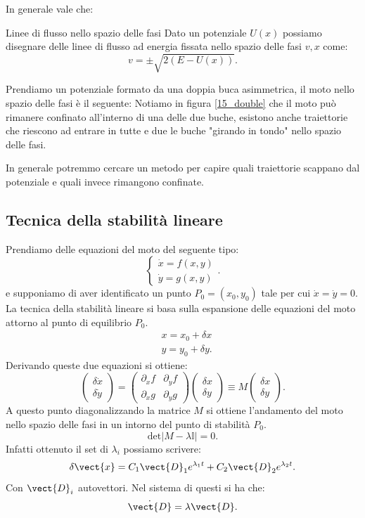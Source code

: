 \noindent
In generale vale che:
\begin{redbox}{Linee di flusso nello spazio delle fasi}
    Dato un potenziale $U(x)$ possiamo disegnare delle linee di flusso ad energia fissata nello spazio delle fasi $v,x$ come:
    \[
	v = \pm \sqrt{2(E-U(x))} 
    .\] 
\end{redbox}
\noindent
\begin{exmp}
Prendiamo un potenziale formato da una doppia buca asimmetrica, il moto nello spazio delle fasi è il seguente:    
%
Notiamo in figura \ref{15_double} che il moto può rimanere confinato all'interno di una delle due buche, esistono anche traiettorie che riescono ad entrare in tutte e due le buche "girando in tondo" nello spazio delle fasi. 
\end{exmp}
\noindent
In generale potremmo cercare un metodo per capire quali traiettorie scappano dal potenziale e quali invece rimangono confinate.
\subsection{Tecnica della stabilità lineare}%
\label{sub:Tecnica della stabilità lineare}
Prendiamo delle equazioni del moto del seguente tipo:
\[
    \begin{cases}
	\dot{x} = f(x, y) \\
	\dot{y} = g(x,y) 
    \end{cases}
.\] 
e supponiamo di aver identificato un punto $P_0=(x_0, y_0)$ tale per cui $\dot{x}=\dot{y}=0$.\\
La tecnica della stabilità lineare si basa sulla espansione delle equazioni del moto attorno al punto di equilibrio $P_0$.
\[\begin{aligned}
    & x = x_0 + \delta x\\
    & y = y_0 + \delta y
.\end{aligned}\]
Derivando queste due equazioni si ottiene: 
\[
    \begin{pmatrix} \delta\dot{x} \\ \delta\dot{y} \end{pmatrix} =
    \begin{pmatrix} 
	\partial_{x}f & \partial_{y}f\\
	\partial_{x}g & \partial_{y}g
    \end{pmatrix} 
    \begin{pmatrix} \delta x \\ \delta y \end{pmatrix} 
    \equiv 
    M 
    \begin{pmatrix} \delta x \\ \delta y \end{pmatrix} 
.\] 
A questo punto diagonalizzando la matrice $M$ si ottiene l'andamento del moto nello spazio delle fasi in un intorno del punto di stabilità $P_0$.
\[
    \text{det}\left|M-\lambda\mathbb{I}\right|=0
.\] 
Infatti ottenuto il set di $\lambda_i$ possiamo scrivere:
\[
    \delta \vect{x} = C_1\vect{D}_1e^{\lambda_1t} + C_2\vect{D}_2e^{\lambda_2t}
.\] 
Con $\vect{D}_i$ autovettori. Nel sistema di questi si ha che:
\[
    \dot{\vect{D}}  = \lambda  \vect{D}
.\] 
